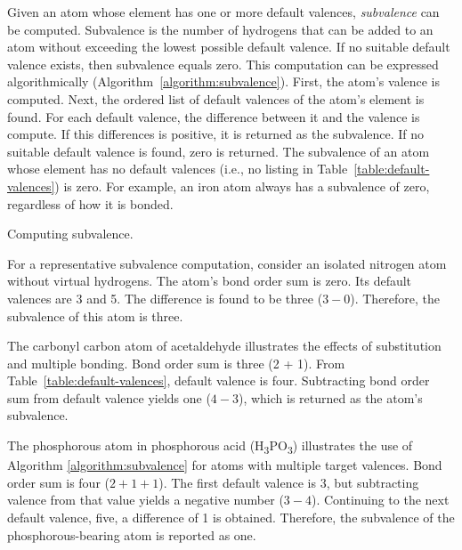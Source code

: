 \documentclass{article}
\begin{document}
Given an atom whose element has one or more default valences, \textit{subvalence} can be computed. Subvalence is the number of hydrogens that can be added to an atom without exceeding the lowest possible default valence. If no suitable default valence exists, then subvalence equals zero. This computation can be expressed algorithmically (Algorithm~\ref{algorithm:subvalence}). First, the atom's valence is computed. Next, the ordered list of default valences of the atom's element is found. For each default valence, the difference between it and the valence is compute. If this differences is positive, it is returned as the subvalence. If no suitable default valence is found, zero is returned. The subvalence of an atom whose element has no default valences (i.e., no listing in Table~\ref{table:default-valences}) is zero. For example, an iron atom always has a subvalence of zero, regardless of how it is bonded.

\begin{algorithm}
    \caption{Computing subvalence.}
    \label{algorithm:subvalence}
    
\end{algorithm}

For a representative subvalence computation, consider an isolated nitrogen atom without virtual hydrogens. The atom's bond order sum is zero. Its default valences are 3 and 5. The difference is found to be three ($3 - 0$). Therefore, the subvalence of this atom is three.

The carbonyl carbon atom of acetaldehyde illustrates the effects of substitution and multiple bonding. Bond order sum is three (2 + 1). From Table~\ref{table:default-valences}, default valence is four. Subtracting bond order sum from default valence yields one ($4 - 3$), which is returned as the atom's subvalence.

The phosphorous atom in phosphorous acid (H\textsubscript{3}PO\textsubscript{3}) illustrates the use of Algorithm \ref{algorithm:subvalence} for atoms with multiple target valences. Bond order sum is four ($2 + 1 + 1$). The first default valence is 3, but subtracting valence from that value yields a negative number ($3 - 4$). Continuing to the next default valence, five, a difference of 1 is obtained. Therefore, the subvalence of the phosphorous-bearing atom is reported as one.
\end{document}
